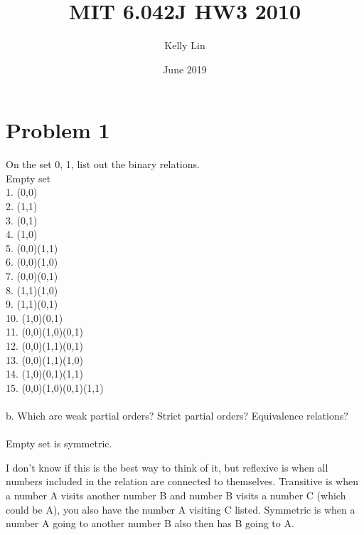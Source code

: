 \documentclass{article}
\title{MIT 6.042J HW3 2010}
\author{ Kelly Lin }
\date{June 2019}
\begin{document}
\maketitle

\section{Problem 1}
On the set {0, 1}, list out the binary relations. 
\\
Empty set
\\
1. (0,0)
\\
2. (1,1)
\\
3. (0,1)
\\
4. (1,0)
\\
5. (0,0)(1,1)
\\
6. (0,0)(1,0)
\\
7. (0,0)(0,1)
\\
8. (1,1)(1,0)
\\
9. (1,1)(0,1)
\\
10. (1,0)(0,1)
\\
11. (0,0)(1,0)(0,1)
\\
12. (0,0)(1,1)(0,1)
\\
13. (0,0)(1,1)(1,0)
\\
14. (1,0)(0,1)(1,1)
\\
15. (0,0)(1,0)(0,1)(1,1)
\\\\
b. Which are weak partial orders? Strict partial orders? Equivalence relations?
\\\\
Empty set is symmetric. 

I don't know if this is the best way to think of it, but reflexive is when all numbers included in the relation are connected to themselves. Transitive is when a number A visits another number B and number B visits a number C (which could be A), you also have the number A visiting C listed. Symmetric is when a number A going to another number B also then has B going to A. 
\end{document}
